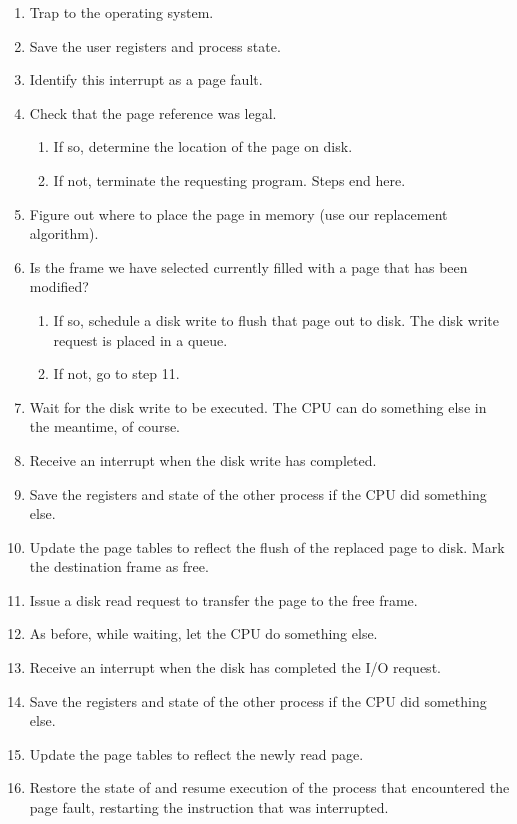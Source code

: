 \begin{enumerate}
	\item Trap to the operating system.
	\item Save the user registers and process state.
	\item Identify this interrupt as a page fault.
	\item Check that the page reference was legal. 
	\begin{enumerate}
		\item If so, determine the location of the page on disk.
		\item If not, terminate the requesting program. Steps end here.
	\end{enumerate}
	\item Figure out where to place the page in memory (use our replacement algorithm).
	\item Is the frame we have selected currently filled with a page that has been modified? 
	\begin{enumerate}
		\item If so, schedule a disk write to flush that page out to disk. The disk write request is placed in a queue.
		\item If not, go to step 11.
	\end{enumerate} 
	\item Wait for the disk write to be executed. The CPU can do something else in the meantime, of course.
	\item Receive an interrupt when the disk write has completed.
	\item Save the registers and state of the other process if the CPU did something else.
	\item Update the page tables to reflect the flush of the replaced page to disk. Mark the destination frame as free.
	\item Issue a disk read request to transfer the page to the free frame.
	\item As before, while waiting, let the CPU do something else.
	\item Receive an interrupt when the disk has completed the I/O request.
	\item Save the registers and state of the other process if the CPU did something else.
	\item Update the page tables to reflect the newly read page.
	\item Restore the state of and resume execution of the process that encountered the page fault, restarting the instruction that was interrupted.
\end{enumerate}

